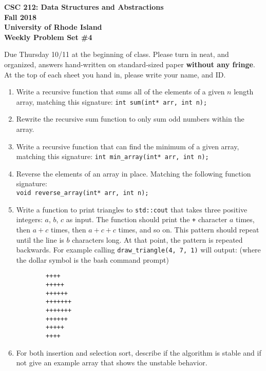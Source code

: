 \documentclass[11pt]{article}
\begin{document}
    \thispagestyle{empty}
    
    \begin{center}
        {\Large\bf CSC 212: Data Structures and Abstractions}\\
        \medskip
        {\Large\bf Fall 2018}\\
        \medskip
        {\Large\bf University of Rhode Island}\\
        \bigskip
        {\Large\bf Weekly Problem Set \#4}
    \end{center}
    
    Due Thursday 10/11 at the beginning of class. Please turn in neat, and organized, answers hand-written on standard-sized paper \textbf{without any fringe}. At the top of each sheet you hand in, please write your name, and ID.
    
    \begin{enumerate}
        \item Write a recursive function that sums all of the elements of a given $n$ length array, matching this signature: \verb|int sum(int* arr, int n);|
        \item Rewrite the recursive sum function to only sum odd numbers within the array.
        \item Write a recursive function that can find the minimum of a given array, matching this signature:
        \verb|int min_array(int* arr, int n);|
        \item Reverse the elements of an array in place. Matching the following function signature:\\
        \verb|void reverse_array(int* arr, int n);|
    \item Write a function to print triangles to \verb|std::cout| that takes three positive integers: $a$, $b$, $c$ as input. The function should print the \verb|+| character $a$ times, then $a+c$ times, then $a+c+c$ times, and so on. This pattern should repeat until the line is $b$ characters long. At that point, the pattern is repeated backwards. For example calling \verb|draw_triangle(4, 7, 1)| will output: (where the dollar symbol is the bash command prompt)
    \begin{verbatim}
        ++++
        +++++
        ++++++
        +++++++
        +++++++
        ++++++
        +++++
        ++++
    \end{verbatim} 

    \item For both insertion and selection sort, describe if the algorithm is stable and if not give an example array that shows the unstable behavior.
    \end{enumerate}
    
    \label{r:lastpage}
    
    
\end{document}
